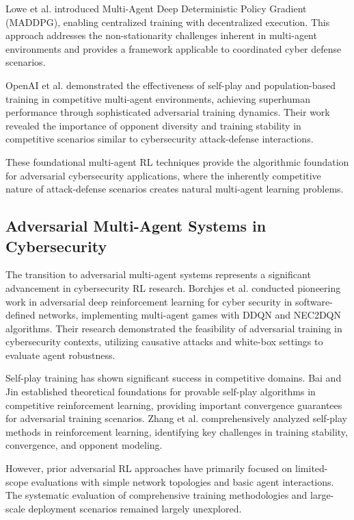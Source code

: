 \documentclass[12pt,oneside]{article}
\begin{document}
Lowe et al. \cite{lowe2017multi} introduced Multi-Agent Deep Deterministic Policy Gradient (MADDPG), enabling centralized training with decentralized execution. This approach addresses the non-stationarity challenges inherent in multi-agent environments and provides a framework applicable to coordinated cyber defense scenarios.

OpenAI et al. \cite{openai2019dota} demonstrated the effectiveness of self-play and population-based training in competitive multi-agent environments, achieving superhuman performance through sophisticated adversarial training dynamics. Their work revealed the importance of opponent diversity and training stability in competitive scenarios similar to cybersecurity attack-defense interactions.

These foundational multi-agent RL techniques provide the algorithmic foundation for adversarial cybersecurity applications, where the inherently competitive nature of attack-defense scenarios creates natural multi-agent learning problems.

\subsection{Adversarial Multi-Agent Systems in Cybersecurity}

The transition to adversarial multi-agent systems represents a significant advancement in cybersecurity RL research. Borchjes et al. \cite{borchjes2023adversarial} conducted pioneering work in adversarial deep reinforcement learning for cyber security in software-defined networks, implementing multi-agent games with DDQN and NEC2DQN algorithms. Their research demonstrated the feasibility of adversarial training in cybersecurity contexts, utilizing causative attacks and white-box settings to evaluate agent robustness.

Self-play training has shown significant success in competitive domains. Bai and Jin \cite{bai2020provable} established theoretical foundations for provable self-play algorithms in competitive reinforcement learning, providing important convergence guarantees for adversarial training scenarios. Zhang et al. \cite{zhang2024survey} comprehensively analyzed self-play methods in reinforcement learning, identifying key challenges in training stability, convergence, and opponent modeling.

However, prior adversarial RL approaches have primarily focused on limited-scope evaluations with simple network topologies and basic agent interactions. The systematic evaluation of comprehensive training methodologies and large-scale deployment scenarios remained largely unexplored.
\end{document}
